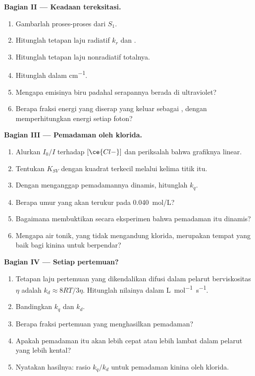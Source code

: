 \begin{problem}
\medskip\noindent\textbf{Bagian II --- Keadaan tereksitasi.}
\begin{enumerate}[resume, beginpenalty=10000]
  \item Gambarlah  proses-proses dari $S_1$.
  \item Hitunglah tetapan laju radiatif $k_r$ dan .
  \item Hitunglah tetapan laju nonradiatif totalnya.
  \item Hitunglah  dalam \unit{cm^{-1}}.
  \item Mengapa emisinya biru padahal serapannya berada di ultraviolet?
  \item Berapa fraksi energi yang diserap yang keluar sebagai ,
        dengan memperhitungkan energi setiap foton?
\end{enumerate}

\medskip\noindent\textbf{Bagian III --- Pemadaman oleh klorida.}
\begin{enumerate}[resume, beginpenalty=10000]
  \item Alurkan $I_0/I$ terhadap $[\ce{Cl-}]$ dan periksalah bahwa grafiknya
        linear.
  \item Tentukan $K_{SV}$ dengan kuadrat terkecil melalui kelima titik itu.
  \item Dengan menganggap pemadamannya dinamis, hitunglah $k_q$.
  \item Berapa umur yang akan terukur pada \qty{0.040}{mol/L}?
  \item Bagaimana membuktikan secara eksperimen bahwa pemadaman itu dinamis?
  \item Mengapa air tonik, yang tidak mengandung klorida, merupakan tempat
        yang baik bagi kinina untuk berpendar?
\end{enumerate}

\medskip\noindent\textbf{Bagian IV --- Setiap pertemuan?}
\begin{enumerate}[resume, beginpenalty=10000]
  \item Tetapan laju pertemuan yang dikendalikan difusi dalam pelarut
        berviskositas $\eta$ adalah $k_d \approx 8RT/3\eta$. Hitunglah nilainya
        dalam \unit{L.mol^{-1}.s^{-1}}.
  \item Bandingkan $k_q$ dan $k_d$.
  \item Berapa fraksi pertemuan yang menghasilkan pemadaman?
  \item Apakah pemadaman itu akan lebih cepat atau lebih lambat dalam pelarut
        yang lebih kental?
  \item Nyatakan hasilnya: rasio $k_q/k_d$ untuk pemadaman kinina oleh klorida.
\end{enumerate}
\end{problem}
